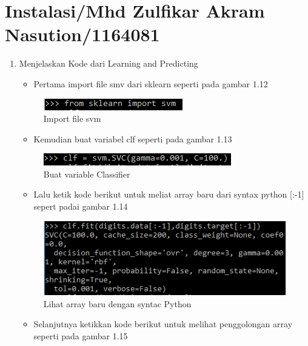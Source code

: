 \section{Instalasi/Mhd Zulfikar Akram Nasution/1164081}
\begin{enumerate}
\item Menjelaskan Kode dari Learning and Predicting
\begin{itemize}
\item Pertama import file smv dari sklearn seperti pada gambar 1.12
\end{itemize}
\begin{figure}[ht]
\centering
\includegraphics[scale=0.9]{figures/2_1.png}
\caption{Import file svm}
\label{Import svm}
\end{figure}
\begin{itemize}
\item Kemudian buat variabel clf seperti pada gambar 1.13
\end{itemize}
\begin{figure}[ht]
\centering
\includegraphics[scale=0.9]{figures/2_2.png}
\caption{Buat variable Classifier}
\label{Variabel clf}
\end{figure}
\begin{itemize}
\item Lalu ketik kode berikut untuk meliat array baru dari syntax python [:-1] sepert padai gambar 1.14
\end{itemize}
\begin{figure}[ht]
\centering
\includegraphics[scale=0.7]{figures/2_3.png}
\caption{Lihat array baru dengan syntac Python}
\label{Syntax python}
\end{figure}
\begin{itemize}
\item Selanjutnya ketikkan kode berikut untuk melihat penggolongan array seperti pada gambar 1.15
\end{itemize}

\end{enumerate}
